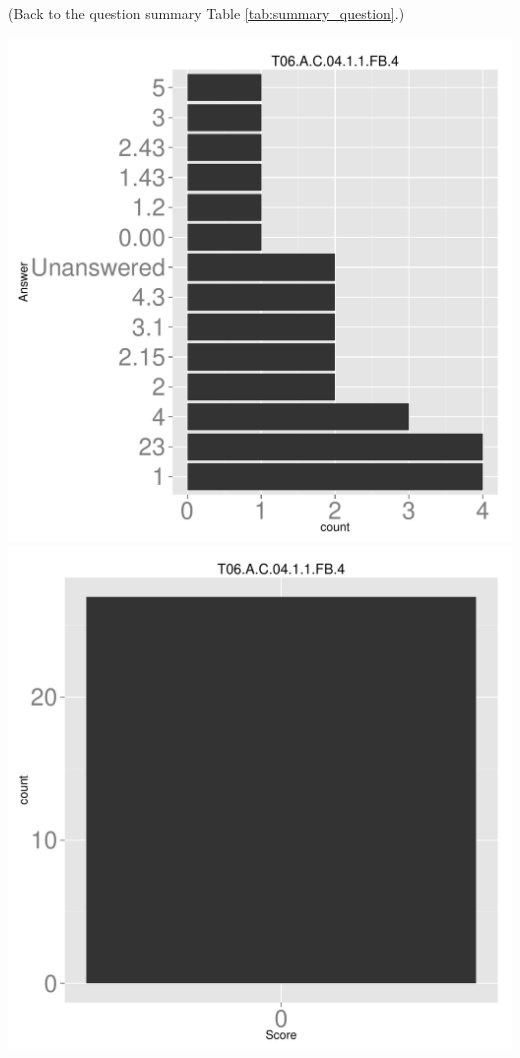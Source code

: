 \documentclass[12pt,nohyper]{tufte-handout}\usepackage[]{graphicx}\usepackage[]{color}
\begin{document}
 (Back to the question summary Table \ref{tab:summary_question}.)

\begin{center} \includegraphics[width=.45\linewidth]{Topic06_12_answer} \includegraphics[width=.45\linewidth]{Topic06_12_score} \end{center} 
\end{document}
